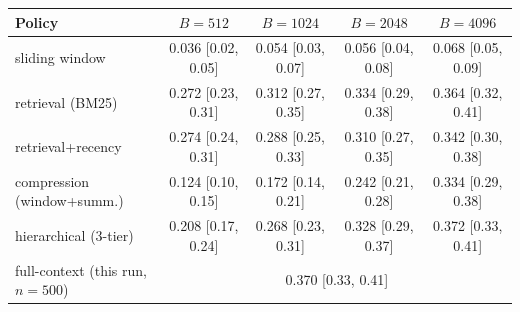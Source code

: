 \begin{tabular}{lcccc}
\toprule
Policy & $B{=}512$ & $B{=}1024$ & $B{=}2048$ & $B{=}4096$ \\
\midrule
sliding window & 0.036 [0.02, 0.05] & 0.054 [0.03, 0.07] & 0.056 [0.04, 0.08] & 0.068 [0.05, 0.09] \\
retrieval (BM25) & 0.272 [0.23, 0.31] & 0.312 [0.27, 0.35] & 0.334 [0.29, 0.38] & 0.364 [0.32, 0.41] \\
retrieval+recency & 0.274 [0.24, 0.31] & 0.288 [0.25, 0.33] & 0.310 [0.27, 0.35] & 0.342 [0.30, 0.38] \\
compression (window+summ.) & 0.124 [0.10, 0.15] & 0.172 [0.14, 0.21] & 0.242 [0.21, 0.28] & 0.334 [0.29, 0.38] \\
hierarchical (3-tier) & 0.208 [0.17, 0.24] & 0.268 [0.23, 0.31] & 0.328 [0.29, 0.37] & 0.372 [0.33, 0.41] \\
\midrule
full-context (this run, $n{=}500$) & \multicolumn{4}{c}{0.370 [0.33, 0.41]} \\
\bottomrule
\end{tabular}